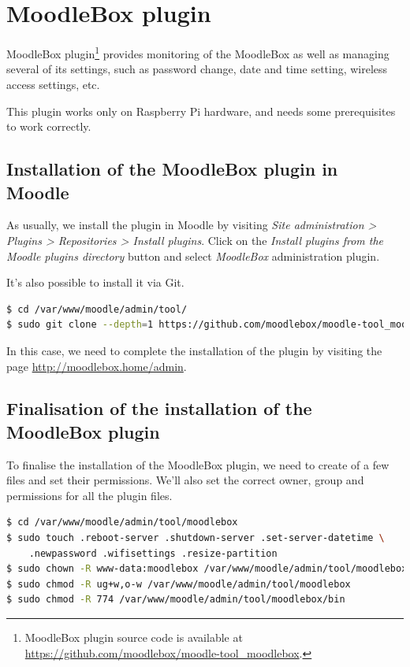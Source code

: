 \documentclass[12pt]{article}
\begin{document}

\section{MoodleBox plugin}

MoodleBox plugin\footnote{MoodleBox plugin source code is available at \url{https://github.com/moodlebox/moodle-tool_moodlebox}.} provides monitoring of the MoodleBox as well as managing several of its settings, such as password change, date and time setting, wireless access settings, etc.

This plugin works only on Raspberry Pi hardware, and needs some prerequisites to work correctly.

\subsection{Installation of the MoodleBox plugin in Moodle}

As usually, we install the plugin in Moodle by visiting \emph{Site administration > Plugins > Repositories > Install plugins}.
Click on the \emph{Install plugins from the Moodle plugins directory} button and select \emph{MoodleBox} administration plugin.

It's also possible to install it via Git.

\begin{lstlisting}[language=bash]
$ cd /var/www/moodle/admin/tool/
$ sudo git clone --depth=1 https://github.com/moodlebox/moodle-tool_moodlebox.git moodlebox
\end{lstlisting}

In this case, we need to complete the installation of the plugin by visiting the page \url{http://moodlebox.home/admin}.

\subsection{Finalisation of the installation of the MoodleBox plugin}

To finalise the installation of the MoodleBox plugin, we need to create of a few files and set their permissions.
We'll also set the correct owner, group and permissions for all the plugin files.
\begin{lstlisting}[language=bash]
$ cd /var/www/moodle/admin/tool/moodlebox
$ sudo touch .reboot-server .shutdown-server .set-server-datetime \ 
    .newpassword .wifisettings .resize-partition
$ sudo chown -R www-data:moodlebox /var/www/moodle/admin/tool/moodlebox
$ sudo chmod -R ug+w,o-w /var/www/moodle/admin/tool/moodlebox
$ sudo chmod -R 774 /var/www/moodle/admin/tool/moodlebox/bin
\end{lstlisting}
\end{document}
